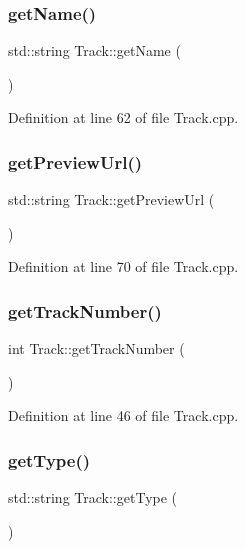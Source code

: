 \subsubsection{\texorpdfstring{get\+Name()}{getName()}}
{\footnotesize\ttfamily std\+::string Track\+::get\+Name (\begin{DoxyParamCaption}{ }\end{DoxyParamCaption})}



Definition at line 62 of file Track.\+cpp.

\mbox{\label{class_track_ae2b2effafa262d094cccfa395f7e0588}} 
\subsubsection{\texorpdfstring{get\+Preview\+Url()}{getPreviewUrl()}}
{\footnotesize\ttfamily std\+::string Track\+::get\+Preview\+Url (\begin{DoxyParamCaption}{ }\end{DoxyParamCaption})}



Definition at line 70 of file Track.\+cpp.

\mbox{\label{class_track_a41073d0003e0f1a3493e35159ebfeb39}} 
\subsubsection{\texorpdfstring{get\+Track\+Number()}{getTrackNumber()}}
{\footnotesize\ttfamily int Track\+::get\+Track\+Number (\begin{DoxyParamCaption}{ }\end{DoxyParamCaption})}



Definition at line 46 of file Track.\+cpp.

\mbox{\label{class_track_af9cd9c3ab48eebe36c1a7863df0949f3}} 
\subsubsection{\texorpdfstring{get\+Type()}{getType()}}
{\footnotesize\ttfamily std\+::string Track\+::get\+Type (\begin{DoxyParamCaption}{ }\end{DoxyParamCaption})}



